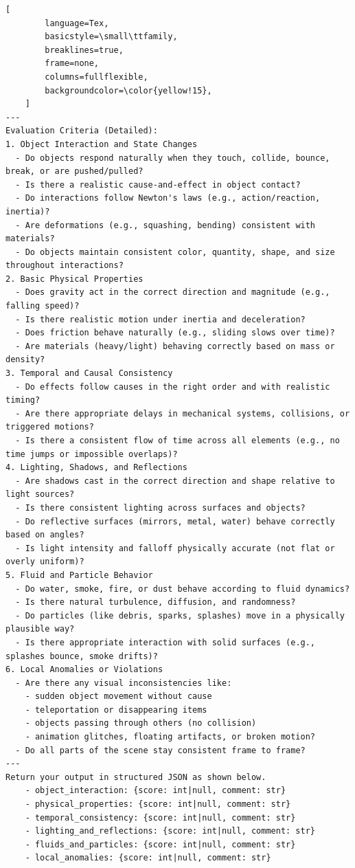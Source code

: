 \begin{tcolorbox}[
    promptstyle, 
    width=\linewidth, 
    breakable
]
\begin{lstlisting}[
        language=Tex, 
        basicstyle=\small\ttfamily,
        breaklines=true,
        frame=none, 
        columns=fullflexible,
        backgroundcolor=\color{yellow!15}, 
    ]
---
Evaluation Criteria (Detailed):
1. Object Interaction and State Changes
  - Do objects respond naturally when they touch, collide, bounce, break, or are pushed/pulled?
  - Is there a realistic cause-and-effect in object contact?
  - Do interactions follow Newton's laws (e.g., action/reaction, inertia)?
  - Are deformations (e.g., squashing, bending) consistent with materials?
  - Do objects maintain consistent color, quantity, shape, and size throughout interactions?
2. Basic Physical Properties
  - Does gravity act in the correct direction and magnitude (e.g., falling speed)?
  - Is there realistic motion under inertia and deceleration?
  - Does friction behave naturally (e.g., sliding slows over time)?
  - Are materials (heavy/light) behaving correctly based on mass or density?
3. Temporal and Causal Consistency
  - Do effects follow causes in the right order and with realistic timing?
  - Are there appropriate delays in mechanical systems, collisions, or triggered motions?
  - Is there a consistent flow of time across all elements (e.g., no time jumps or impossible overlaps)?
4. Lighting, Shadows, and Reflections
  - Are shadows cast in the correct direction and shape relative to light sources?
  - Is there consistent lighting across surfaces and objects?
  - Do reflective surfaces (mirrors, metal, water) behave correctly based on angles?
  - Is light intensity and falloff physically accurate (not flat or overly uniform)?
5. Fluid and Particle Behavior
  - Do water, smoke, fire, or dust behave according to fluid dynamics?
  - Is there natural turbulence, diffusion, and randomness?
  - Do particles (like debris, sparks, splashes) move in a physically plausible way?
  - Is there appropriate interaction with solid surfaces (e.g., splashes bounce, smoke drifts)?
6. Local Anomalies or Violations
  - Are there any visual inconsistencies like:
    - sudden object movement without cause
    - teleportation or disappearing items
    - objects passing through others (no collision)
    - animation glitches, floating artifacts, or broken motion?
  - Do all parts of the scene stay consistent frame to frame?
---
Return your output in structured JSON as shown below.
    - object_interaction: {score: int|null, comment: str}
    - physical_properties: {score: int|null, comment: str}
    - temporal_consistency: {score: int|null, comment: str}
    - lighting_and_reflections: {score: int|null, comment: str}
    - fluids_and_particles: {score: int|null, comment: str}
    - local_anomalies: {score: int|null, comment: str}
    \end{lstlisting}
    
\end{tcolorbox}

